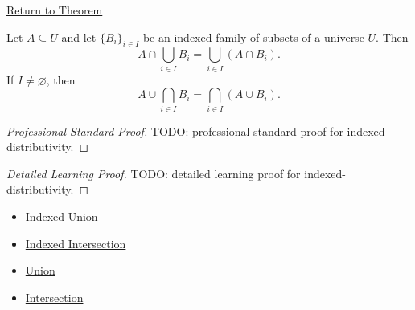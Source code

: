 \newpage
{}
\label{prf:indexed-distributivity}

\begin{remark*}[Return]
\hyperref[thm:indexed-distributivity]{Return to Theorem}
\end{remark*}

\begin{theorem*}
Let $A\subseteq U$ and let $\{B_i\}_{i\in I}$ be an indexed family of subsets
of a universe $U$. Then
\[
A\cap\bigcup_{i\in I}B_i
=
\bigcup_{i\in I}(A\cap B_i).
\]
If $I\neq\varnothing$, then
\[
A\cup\bigcap_{i\in I}B_i
=
\bigcap_{i\in I}(A\cup B_i).
\]
\end{theorem*}

\begin{proof}[Professional Standard Proof]
\LRAProofBodyStart
TODO: professional standard proof for indexed-distributivity.
\end{proof}

\begin{proof}[Detailed Learning Proof]
\LRAProofBodyStart
TODO: detailed learning proof for indexed-distributivity.
\end{proof}

\begin{remark*}
\end{remark*}

\begin{dependencies}
\begin{itemize}
  \item \hyperref[def:indexed-union]{Indexed Union}
  \item \hyperref[def:indexed-intersection]{Indexed Intersection}
  \item \hyperref[def:union]{Union}
  \item \hyperref[def:intersection]{Intersection}
\end{itemize}
\end{dependencies}

\clearpage
